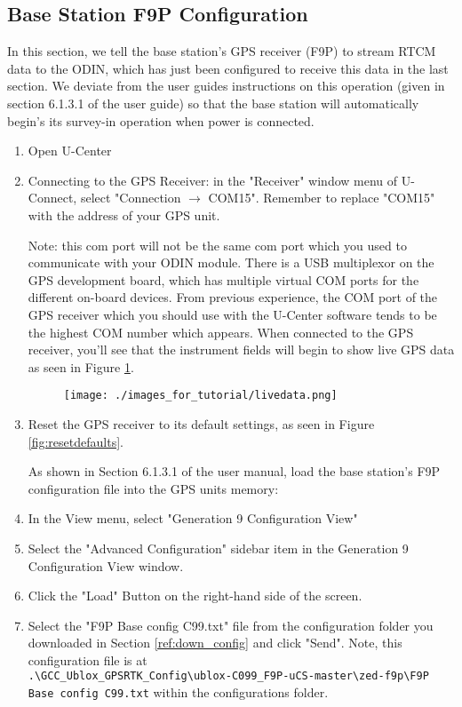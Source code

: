 \documentclass{article}%
\begin{document}
\subsection{Base Station F9P Configuration}\label{ref:bs_f9p_config}
	In this section, we tell the base station's GPS receiver (F9P) to stream RTCM data to the ODIN, which has just been configured to receive this data in the last section.  We deviate from the user guides instructions on this operation (given in section 6.1.3.1 of the user guide) so that the base station will automatically begin's its survey-in operation when power is connected.
	
	\begin{enumerate}
	\item Open U-Center
	\item Connecting to the GPS Receiver: in the "Receiver" window menu of U-Connect, select "Connection $\rightarrow$ COM15".  Remember to replace "COM15" with the address of your GPS unit.
	
	\begin{myquote} Note: this com port will not be the same com port which you used to communicate with your ODIN module. There is a USB multiplexor on the GPS development board, which has multiple virtual COM ports for the different on-board devices.  From previous experience, the COM port of the GPS receiver which you should use with the U-Center software tends to be the highest COM number which appears.  When connected to the GPS receiver, you'll see that the instrument fields will begin to show live GPS data as seen in Figure \ref{fig:livedata}.
	\end{myquote}
	
	\begin{figure}
		\centering
		\texttt{[image: ./images\_for\_tutorial/livedata.png]}
		\label{fig:livedata}
	\end{figure}
	
	\item Reset the GPS receiver to its default settings, as seen in Figure \ref{fig:resetdefaults}.
	
	As shown in Section 6.1.3.1 of the user manual, load the base station's F9P configuration file into the GPS units memory:
	
	\item In the View menu, select "Generation 9 Configuration View"
	\item Select the "Advanced Configuration" sidebar item in the Generation 9 Configuration View window.
	\item Click the "Load" Button on the right-hand side of the screen.
	\item Select the "F9P Base config C99.txt" file from the configuration folder you downloaded in Section \ref{ref:down_config} and click "Send".  Note, this configuration file is at\\ \texttt{.\textbackslash GCC\_Ublox\_GPSRTK\_Config\textbackslash ublox-C099\_F9P-uCS-master\textbackslash zed-f9p\textbackslash F9P Base config C99.txt} within the configurations folder.
	

\end{enumerate}
\end{document}
